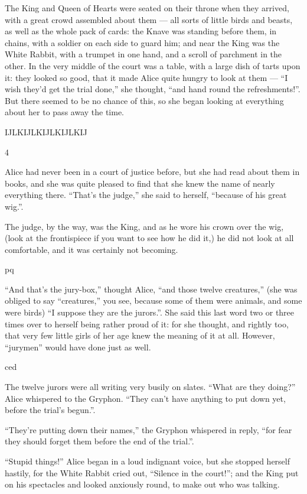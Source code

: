 \documentclass[a4paper]{article}
\newcommand{\wb}[2]{\fontsize{#1}{#2}\usefont{U}{webo}{xl}{n}}
\newcommand{\wbc}[3]{\vspace*{#1}\begin{center}
    \wb{#2}{#2}#3\end{center}\vspace*{#1}}
\newlength{\wsp}\setlength{\wsp}{1ex}
\begin{document}
  The King and Queen of Hearts were seated on their throne
  when they arrived, with a great crowd assembled about them
  --- all sorts of little birds and beasts, as well as the
  whole pack of cards: the Knave was standing before them,
  in chains, with a soldier on each side to guard him; and
  near the King was the White Rabbit, with a trumpet in one
  hand, and a scroll of parchment in the other.  In the very
  middle of the court was a table, with a large dish of
  tarts upon it: they looked so good, that it made Alice
  quite hungry to look at them --- ``I wish they'd get the
  trial done,'' she thought, ``and hand round the
  refreshments!''.  But there seemed to be no chance of this,
  so she began looking at everything about her to pass away
  the time.

  \wbc{2ex}{6}{IJLKIJLKIJLKIJLKIJ}
  \wbc{\wsp}{24pt}{4}

  Alice had never been in a court of justice before, but she
  had read about them in books, and she was quite pleased to
  find that she knew the name of nearly everything there.
  ``That's the judge,'' she said to herself, ``because of his
  great wig.''.
  
  The judge, by the way, was the King, and as he wore his
  crown over the wig, (look at the frontispiece if you want
  to see how he did it,) he did not look at all comfortable,
  and it was certainly not becoming.

  \wbc{1ex}{8}{pq}
  
  ``And that's the jury-box,'' thought Alice, ``and those
  twelve creatures,'' (she was obliged to say ``creatures,''
  you see, because some of them were animals, and some were
  birds) ``I suppose they are the jurors.''.  She said this
  last word two or three times over to herself being rather
  proud of it: for she thought, and rightly too, that very
  few little girls of her age knew the meaning of it at all.
  However, ``jurymen'' would have done just as well.

  \wbc{1ex}{10}{ced}
  
  The twelve jurors were all writing very busily on slates.
  ``What are they doing?'' Alice whispered to the Gryphon.
  ``They can't have anything to put down yet, before the
  trial's begun.''.
  
  ``They're putting down their names,'' the Gryphon
  whispered in reply, ``for fear they should forget them
  before the end of the trial.''.
  
  ``Stupid things!'' Alice began in a loud indignant voice,
  but she stopped herself hastily, for the White Rabbit
  cried out, ``Silence in the court!''; and the King put on
  his spectacles and looked anxiously round, to make out who
  was talking.
\end{document}
